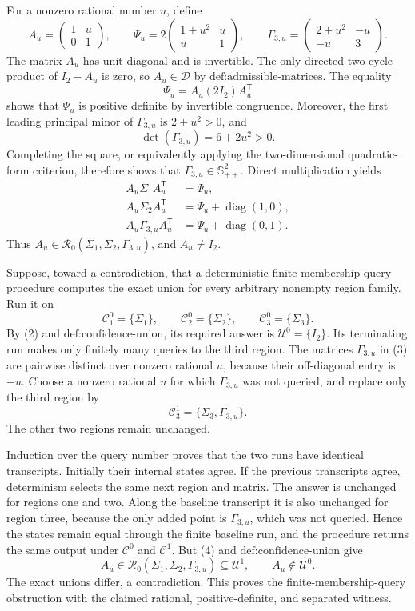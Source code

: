 For a nonzero rational number \(u\), define
\[
 A_u=\begin{pmatrix}1&u\\0&1\end{pmatrix},
 \qquad
 \Psi_u=2\begin{pmatrix}1+u^2&u\\u&1\end{pmatrix},
 \qquad
 \Gamma_{3,u}=\begin{pmatrix}2+u^2&-u\\-u&3\end{pmatrix}.
\tag{3}
\]
The matrix \(A_u\) has unit diagonal and is invertible.  The only directed two-cycle product of \(I_2-A_u\) is zero, so \(A_u\in\mathcal D\) by \(\text{def:admissible-matrices}\).  The equality
\[
 \Psi_u=A_u(2I_2)A_u^{\mathsf T}
\]
shows that \(\Psi_u\) is positive definite by invertible congruence.  Moreover, the first leading principal minor of \(\Gamma_{3,u}\) is \(2+u^2>0\), and
\[
 \det(\Gamma_{3,u})=6+2u^2>0.
\]
Completing the square, or equivalently applying the two-dimensional quadratic-form criterion, therefore shows that \(\Gamma_{3,u}\in\mathbb S_{++}^2\).  Direct multiplication yields
\[
 \begin{aligned}
 A_u\Sigma_1A_u^{\mathsf T}&=\Psi_u,\\
 A_u\Sigma_2A_u^{\mathsf T}&=\Psi_u+\operatorname{diag}(1,0),\\
 A_u\Gamma_{3,u}A_u^{\mathsf T}&=\Psi_u+\operatorname{diag}(0,1).
 \end{aligned}
\tag{4}
\]
Thus \(A_u\in\mathcal R_0(\Sigma_1,\Sigma_2,\Gamma_{3,u})\), and \(A_u\ne I_2\).

Suppose, toward a contradiction, that a deterministic finite-membership-query procedure computes the exact union for every arbitrary nonempty region family.  Run it on
\[
 \mathcal C^0_1=\{\Sigma_1\},
 \qquad
 \mathcal C^0_2=\{\Sigma_2\},
 \qquad
 \mathcal C^0_3=\{\Sigma_3\}.
\]
By (2) and \(\text{def:confidence-union}\), its required answer is \(\mathcal U^0=\{I_2\}\).  Its terminating run makes only finitely many queries to the third region.  The matrices \(\Gamma_{3,u}\) in (3) are pairwise distinct over nonzero rational \(u\), because their off-diagonal entry is \(-u\).  Choose a nonzero rational \(u\) for which \(\Gamma_{3,u}\) was not queried, and replace only the third region by
\[
 \mathcal C^1_3=\{\Sigma_3,\Gamma_{3,u}\}.
\]
The other two regions remain unchanged.

Induction over the query number proves that the two runs have identical transcripts.  Initially their internal states agree.  If the previous transcripts agree, determinism selects the same next region and matrix.  The answer is unchanged for regions one and two.  Along the baseline transcript it is also unchanged for region three, because the only added point is \(\Gamma_{3,u}\), which was not queried.  Hence the states remain equal through the finite baseline run, and the procedure returns the same output under \(\mathcal C^0\) and \(\mathcal C^1\).  But (4) and \(\text{def:confidence-union}\) give
\[
 A_u\in\mathcal R_0(\Sigma_1,\Sigma_2,\Gamma_{3,u})
 \subseteq\mathcal U^1,
 \qquad
 A_u\notin\mathcal U^0.
\]
The exact unions differ, a contradiction.  This proves the finite-membership-query obstruction with the claimed rational, positive-definite, and separated witness.